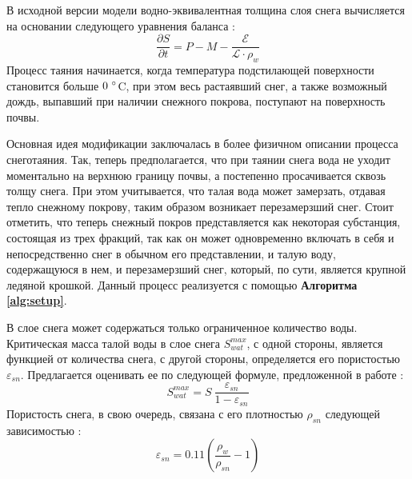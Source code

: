 \documentclass[a4paper, fontsize=14pt]{scrartcl}
\begin{document}
В исходной версии модели водно-эквивалентная толщина слоя снега вычисляется на основании следующего уравнения баланса \cite{Volodin1998, Volodina2000}:
\begin{equation}
    \dfrac{\partial S}{\partial t} = P - M - \dfrac{\mathcal{E}}{\mathcal{L} \cdot \rho_w}  \label{sys}
\end{equation}
Процесс таяния начинается, когда температура подстилающей поверхности становится больше $0 ~\degree$C, при этом весь растаявший снег, а также возможный дождь, выпавший при наличии снежного покрова, поступают на поверхность почвы.


Основная идея модификации заключалась в более физичном описании процесса снеготаяния. Так, теперь предполагается, что при таянии снега вода не уходит моментально на верхнюю границу почвы, а постепенно просачивается сквозь толщу снега. При этом учитывается, что талая вода может замерзать, отдавая тепло снежному покрову, таким образом возникает перезамерзший снег. Стоит отметить, что теперь снежный покров представляется как некоторая субстанция, состоящая из трех фракций, так как он может одновременно включать в себя и непосредственно снег в обычном его представлении, и талую воду, содержащуюся в нем, и перезамерзший снег, который, по сути, является крупной ледяной крошкой. Данный процесс реализуется с помощью \textbf{Алгоритма \ref{alg:setup}}.



В слое снега может содержаться только ограниченное количество воды. Критическая масса талой воды в слое снега $S_{wat}^{max}$, с одной стороны, является функцией от количества снега, с другой стороны, определяется его пористостью $\varepsilon_{sn}$. Предлагается оценивать ее по следующей формуле, предложенной в работе \cite{Gusev2002}:
\begin{equation}
     S_{wat}^{max} = S ~\dfrac{\varepsilon_{sn}}{1 - \varepsilon_{sn}}  \label{sys}  
\end{equation}
Пористость снега, в свою очередь, связана с его плотностью $\rho_{sn}$ следующей зависимостью \cite{Stock}:
\begin{equation}
    \varepsilon_{sn} = 0.11 \left( \dfrac{\rho_w}{\rho_{sn}} - 1 \right)  \label{sys}  
\end{equation}
\end{document}
